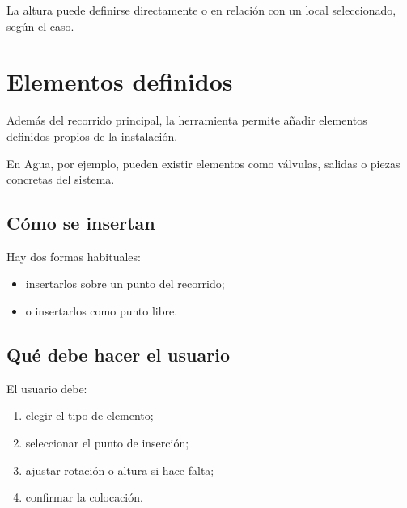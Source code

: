 La altura puede definirse directamente o en relación con un local seleccionado, según el caso.



\section{Elementos definidos}

Además del recorrido principal, la herramienta permite añadir elementos definidos propios de la instalación.

En Agua, por ejemplo, pueden existir elementos como válvulas, salidas o piezas concretas del sistema.

\subsection{Cómo se insertan}

Hay dos formas habituales:

\begin{itemize}
\item insertarlos sobre un punto del recorrido;
\item o insertarlos como punto libre.
\end{itemize}

\subsection{Qué debe hacer el usuario}

El usuario debe:

\begin{enumerate}
\item elegir el tipo de elemento;
\item seleccionar el punto de inserción;
\item ajustar rotación o altura si hace falta;
\item confirmar la colocación.
\end{enumerate}



